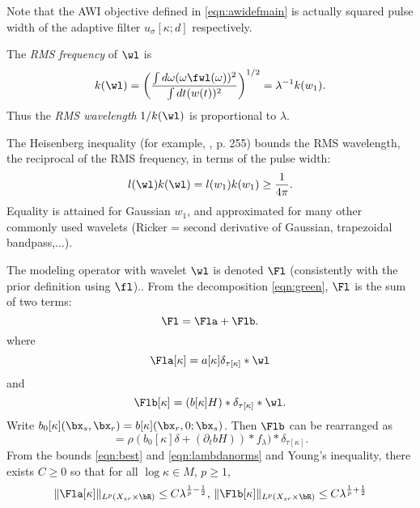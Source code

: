 Note that the AWI objective defined in \ref{eqn:awidefmain} is actually
squared pulse width of the adaptive filter 
$u_{\sigma}[\kappa;d]$ respectively.

The {\em RMS frequency} of $\wl$ is
\begin{equation}
  \label{eqn:freq}
  k(\wl) = \left(\frac{\int d\omega (\omega \fwl(\omega))^2}{\int dt (w(t))^2} \right)^{1/2} = \lambda^{-1}k(w_1).
\end{equation}
Thus the {\em RMS wavelength} $1/k(\wl)$ is proportional to $\lambda$.

The Heisenberg inequality (for example, \cite{Folland:07}, p. 255) bounds the RMS
wavelength, the reciprocal of the RMS frequency, in terms of the pulse
width:
\begin{equation}
  \label{eqn:heis}
  l(\wl) k(\wl) = l(w_1)k(w_1) \ge \frac{1}{4\pi}.
\end{equation}
Equality is attained for Gaussian $w_1$, and approximated for many other
commonly used wavelets (Ricker = second derivative of Gaussian,
trapezoidal bandpass,...).

The modeling operator with wavelet $\wl$ is denoted $\Fl$
(consistently with the prior definition using $\fl$).. From the
decomposition \ref{eqn:green}, $\Fl$ is the sum of two terms:
\begin{equation}
  \label{eqn:Flamdecomp}
  \Fl = \Fla + \Flb.
\end{equation}
where
\begin{equation}
  \label{eqn:Fl0}
  \Fla[\kappa]= a[\kappa]\delta_{\tau[\kappa]}*\wl
\end{equation}
and
\[
\Flb[\kappa] = (b[\kappa]H) *\delta_{\tau[\kappa]}*\wl.
\]
Write $b_0[\kappa](\bx_s,\bx_r) = b[\kappa](\bx_r,0;\bx_s)$. Then
$\Flb$ can be rearranged as
\begin{equation}
  \label{eqn:Fl1}
  =\rho (b_0[\kappa]\delta + (\partial_t b H)) * f_{\lambda} )*\delta_{\tau[\kappa]}.
\end{equation}
From the bounds \ref{eqn:best} and \ref{eqn:lambdanorms} and Young's
inequality, there exists $C \ge 0$ so that for all $\log \kappa \in M$, $p
\ge 1$,
\begin{equation}
  \label{eqn:Frembd}
 \|\Fla[\kappa]\|_{ L^p(X_{sr} \times \bR)} \le C\lambda^{\frac{1}{p}-\frac{1}{2}},\,\|\Flb[\kappa]\|_{ L^p(X_{sr} \times \bR)} \le C\lambda^{\frac{1}{p}+\frac{1}{2}}
\end{equation}

